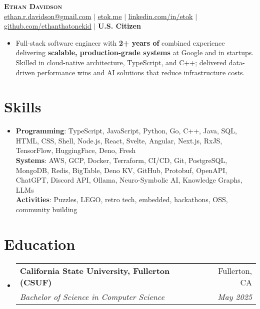 \documentclass[letterpaper,11pt]{article}
\makeatletter
\newcommand{\resumeItem}[1]{
  \item\small{
    {#1 \vspace{-2pt}}
  }
}
\newcommand{\resumeSubheading}[4]{
  \vspace{-2pt}\item
    \begin{tabular*}{0.97\textwidth}[t]{l@{\extracolsep{\fill}}r}
      \textbf{#1} & #2 \\
      \textit{\small#3} & \textit{\small #4} \\
    \end{tabular*}\vspace{-2pt}
}
\newcommand{\resumeSubHeadingListStart}{\begin{itemize}[leftmargin=0.15in, label={}]}
\newcommand{\resumeSubHeadingListEnd}{\end{itemize}}
\makeatother
\begin{document}
\begin{center}
  \textbf{\Huge \scshape Ethan Davidson} \\ \vspace{1pt}
  \small \href{mailto:ethan.r.davidson@gmail.com}{\underline{ethan.r.davidson@gmail.com}} $|$ 
  \href{https://etok.me/}{\underline{etok.me}} $|$
  \href{https://linkedin.com/in/etok}{\underline{linkedin.com/in/etok}} $|$
  \href{https://github.com/ethanthatonekid}{\underline{github.com/ethanthatonekid}} $|$
  \textbf{U.S. Citizen}
\end{center}

\begin{itemize}[leftmargin=0.15in, label={}]
  \resumeItem{Full-stack software engineer with \textbf{2+ years of} combined experience delivering \textbf{scalable, production-grade systems} at Google and in startups. Skilled in cloud-native architecture, TypeScript, and C++; delivered data-driven performance wins and AI solutions that reduce infrastructure costs.}
\end{itemize}

\section{Skills}
\begin{itemize}[leftmargin=0.15in, label={}]
    \resumeItem{
      \textbf{Programming}{: TypeScript, JavaScript, Python, Go, C++, Java, SQL, HTML, CSS, Shell, Node.js, React, Svelte, Angular, Next.js, RxJS, TensorFlow, HuggingFace, Deno, Fresh} \\
      \textbf{Systems}{: AWS, GCP, Docker, Terraform, CI/CD, Git, PostgreSQL, MongoDB, Redis, BigTable, Deno KV, GitHub, Protobuf, OpenAPI, ChatGPT, Discord API, Ollama, Neuro-Symbolic AI, Knowledge Graphs, LLMs} \\
      \textbf{Activities}{: Puzzles, LEGO, retro tech, embedded, hackathons, OSS, community building}
    }
 \end{itemize}

\section{Education}
\resumeSubHeadingListStart
  \resumeSubheading
    {California State University, Fullerton (CSUF)}{Fullerton, CA}
    {Bachelor of Science in Computer Science}{May 2025}
\resumeSubHeadingListEnd
\end{document}

